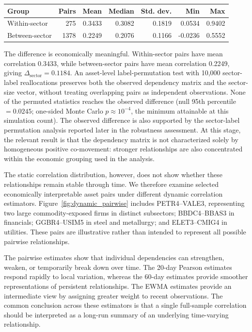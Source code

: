 \begin{center}
\label{tab:sector_corr_summary}
\begin{tabular}{lrrrrrr}
\toprule
Group & Pairs & Mean & Median & Std. dev. & Min & Max \\
\midrule
Within-sector & 275 & 0.3433 & 0.3082 & 0.1819 & 0.0534 & 0.9402 \\
Between-sector & 1378 & 0.2249 & 0.2076 & 0.1166 & -0.0236 & 0.5552 \\
\bottomrule
\end{tabular}
\end{center}


The difference is economically meaningful. Within-sector pairs have mean correlation 0.3433, while between-sector pairs have mean correlation 0.2249, giving $\Delta_{\mathrm{sector}}=0.1184$. An asset-level label-permutation test with 10,000 sector-label reallocations preserves both the observed dependency matrix and the sector-size vector, without treating overlapping pairs as independent observations. None of the permuted statistics reaches the observed difference (null 95th percentile $=0.0245$; one-sided Monte Carlo $p\approx 10^{-4}$, the minimum attainable at this simulation count). The observed difference is also supported by the sector-label permutation analysis reported later in the robustness assessment. At this stage, the relevant result is that the dependency matrix is not characterized solely by homogeneous positive co-movement: stronger relationships are also concentrated within the economic grouping used in the analysis.

The static correlation distribution, however, does not show whether these relationships remain stable through time. We therefore examine selected economically interpretable asset pairs under different dynamic correlation estimators. Figure~\ref{fig:dynamic_pairwise} includes PETR4--VALE3, representing two large commodity-exposed firms in distinct subsectors; BBDC4--BBAS3 in financials; GGBR4--USIM5 in steel and metallurgy; and ELET3--CMIG4 in utilities. These pairs are illustrative rather than intended to represent all possible pairwise relationships.

The pairwise estimates show that individual dependencies can strengthen, weaken, or temporarily break down over time. The 20-day Pearson estimates respond rapidly to local variation, whereas the 60-day estimates provide smoother representations of persistent relationships. The EWMA estimates provide an intermediate view by assigning greater weight to recent observations. The common conclusion across these estimators is that a single full-sample correlation should be interpreted as a long-run summary of an underlying time-varying relationship.

